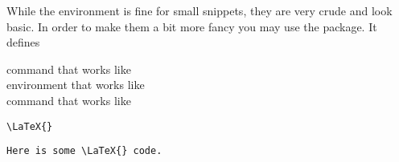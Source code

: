 While the  environment is fine for small snippets, they are very
crude and look basic. In order to make them a bit more fancy you may use the
 package. It defines
\begin{lscommand}
   command that works like  \\
   environment that works like  \\
   command that works like 
\end{lscommand}
\begin{example}[examplewidth=0.6\linewidth, vertical_mode]
\lstinline|\LaTeX{}|

\begin{lstlisting}
Here is some \LaTeX{} code.
\end{lstlisting}


\end{example}

